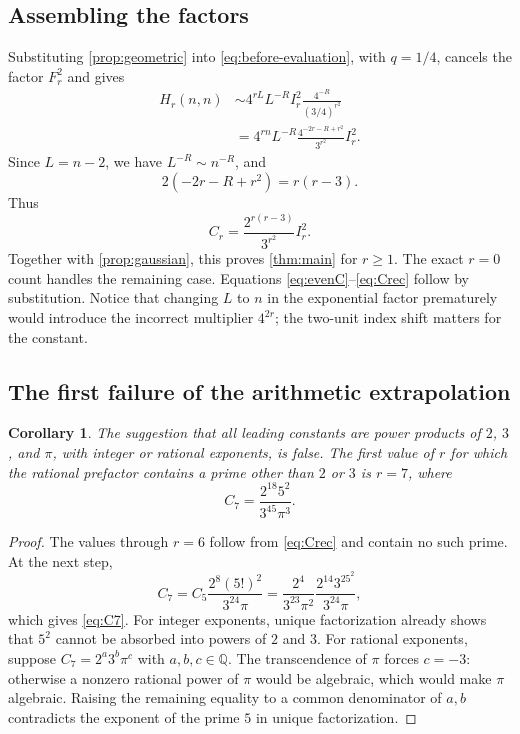 \documentclass[11pt]{article}
\numberwithin{equation}{section}
\newtheorem{corollary}[corollary]{Corollary}
\theoremstyle{definition}
\begin{document}
\subsection{Assembling the factors}
Substituting \cref{prop:geometric} into \eqref{eq:before-evaluation}, with $q=1/4$, cancels the factor $F_r^2$ and gives
\begin{align*}
 H_r(n,n)
 &\sim4^{rL}L^{-R}I_r^2
          \frac{4^{-R}}{(3/4)^{r^2}}\\
 &=4^{rn}L^{-R}\frac{4^{-2r-R+r^2}}{3^{r^2}}I_r^2.
\end{align*}
Since $L=n-2$, we have $L^{-R}\sim n^{-R}$, and
\[
 2(-2r-R+r^2)=r(r-3).
\]
Thus
\begin{equation}\label{eq:CrI}
 C_r=\frac{2^{r(r-3)}}{3^{r^2}}I_r^2.
\end{equation}
Together with \cref{prop:gaussian}, this proves \cref{thm:main} for $r\geq1$. The exact $r=0$ count handles the remaining case. Equations \eqref{eq:evenC}--\eqref{eq:Crec} follow by substitution. Notice that changing $L$ to $n$ in the exponential factor prematurely would introduce the incorrect multiplier $4^{2r}$; the two-unit index shift matters for the constant.

\subsection{The first failure of the arithmetic extrapolation}

\begin{corollary}\label{cor:five}
The suggestion that all leading constants are power products of $2$, $3$, and $\pi$, with integer or rational exponents, is false. The first value of $r$ for which the rational prefactor contains a prime other than $2$ or $3$ is $r=7$, where
\begin{equation}\label{eq:C7}
 C_7=\frac{2^{18}5^2}{3^{45}\pi^3}.
\end{equation}
\end{corollary}

\begin{proof}
The values through $r=6$ follow from \eqref{eq:Crec} and contain no such prime. At the next step,
\[
 C_7=C_5\frac{2^8(5!)^2}{3^{24}\pi}
 =\frac{2^4}{3^{23}\pi^2}
   \frac{2^{14}3^25^2}{3^{24}\pi},
\]
which gives \eqref{eq:C7}. For integer exponents, unique factorization already shows that $5^2$ cannot be absorbed into powers of $2$ and $3$. For rational exponents, suppose $C_7=2^a3^b\pi^c$ with $a,b,c\in\mathbb Q$. The transcendence of $\pi$ forces $c=-3$: otherwise a nonzero rational power of $\pi$ would be algebraic, which would make $\pi$ algebraic. Raising the remaining equality to a common denominator of $a,b$ contradicts the exponent of the prime $5$ in unique factorization.
\end{proof}
\end{document}
